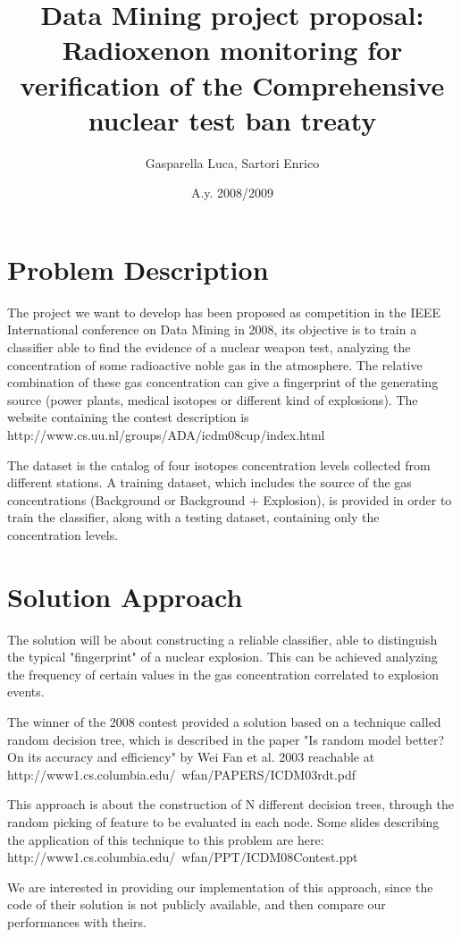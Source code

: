 \documentclass[12pt,a4paper]{article}
\title{Data Mining project proposal:\\
Radioxenon monitoring for verification of the Comprehensive nuclear test ban
treaty}
\author{Gasparella Luca, Sartori Enrico}
\date{A.y. 2008/2009}
\begin{document}
\maketitle
\section{Problem Description}
The project we want to develop has been proposed as competition in the
IEEE International conference on Data Mining in 2008, its objective is 
to train a classifier able to find the evidence of a nuclear weapon test,
analyzing the concentration of some radioactive noble gas in the atmosphere.
The relative combination of these gas concentration can give a fingerprint
of the generating source (power plants, medical isotopes or different kind
of explosions).
The website containing the contest description is 
http://www.cs.uu.nl/groups/ADA/icdm08cup/index.html

The dataset is the catalog of four isotopes concentration levels collected 
from different stations. A training dataset, which includes the source of
the gas concentrations (Background or Background + Explosion), is provided
in order to train the classifier, along with a testing dataset, containing 
only the concentration levels.

\section{Solution Approach}
The solution will be about constructing a reliable classifier, able to 
distinguish the typical "fingerprint" of a nuclear explosion. This can be
achieved analyzing the frequency of certain values in the gas concentration
correlated to explosion events.

The winner of the 2008 contest provided a solution based on a technique called
random decision tree, which is described in the paper "Is random model better?
On its accuracy and efficiency" by Wei Fan et al. 2003 reachable at 
http://www1.cs.columbia.edu/~wfan/PAPERS/ICDM03rdt.pdf

This approach is about the construction of N different decision trees, through
the random picking of feature to be evaluated in each node.
Some slides describing the application of this technique to this problem are
here: http://www1.cs.columbia.edu/~wfan/PPT/ICDM08Contest.ppt

We are interested in providing our implementation of this approach, since the
code of their solution is not publicly available, and then compare our
performances with theirs.
\end{document}

